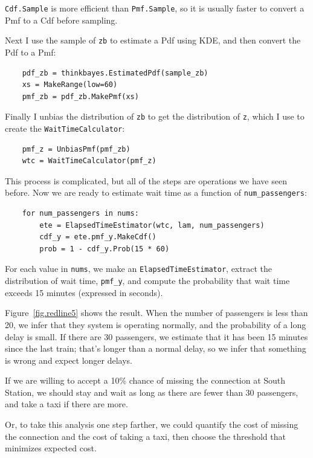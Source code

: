 \documentclass[12pt]{book}
\begin{document}
{\tt Cdf.Sample} is more efficient than {\tt Pmf.Sample}, so it
is usually faster to convert a Pmf to a Cdf before sampling.

Next I use the sample of {\tt zb} to estimate a Pdf using
KDE, and then convert the Pdf to a Pmf:

\begin{verbatim}
    pdf_zb = thinkbayes.EstimatedPdf(sample_zb)
    xs = MakeRange(low=60)
    pmf_zb = pdf_zb.MakePmf(xs)
\end{verbatim}

Finally I unbias the distribution of {\tt zb} to get the
distribution of {\tt z}, which I use to create the
{\tt WaitTimeCalculator}:

\begin{verbatim}
    pmf_z = UnbiasPmf(pmf_zb)
    wtc = WaitTimeCalculator(pmf_z)
\end{verbatim}

This process is complicated, but
all of the steps are operations we have seen before.
Now we are ready to estimate wait time as a function of
\verb"num_passengers":

\begin{verbatim}
    for num_passengers in nums:
        ete = ElapsedTimeEstimator(wtc, lam, num_passengers)
        cdf_y = ete.pmf_y.MakeCdf()
        prob = 1 - cdf_y.Prob(15 * 60)
\end{verbatim}

For each value in {\tt nums}, we make an {\tt ElapsedTimeEstimator},
extract the distribution of wait time, \verb"pmf_y", and compute
the probability that wait time exceeds 15 minutes (expressed in seconds).

Figure~\ref{fig.redline5} shows the result.  When the number of
passengers is less than 20, we infer that they system is
operating normally, and the probability of a long delay is small.
If there are 30 passengers, we estimate that it has been 15
minutes since the last train; that's longer than a normal delay,
so we infer that something is wrong and expect longer delays.

If we are willing to accept a 10\% chance of missing the connection
at South Station, we should stay and wait as long as there
are fewer than 30 passengers, and take a taxi if there are more.

Or, to take this analysis one step farther, we could quantify the cost
of missing the connection and the cost of taking a taxi, then choose
the threshold that minimizes expected cost.
\end{document}
